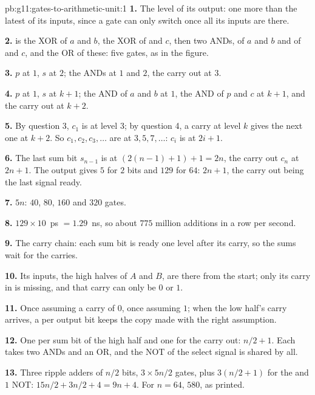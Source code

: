 \begin{solution}{pb:g11:gates-to-arithmetic-unit:1}
\textbf{1.} The level of its output: one more than the latest of its inputs, since a gate can only switch once all
its inputs are there.

\textbf{2.}  is the XOR of $a$ and $b$,  the XOR of  and $c$, then two ANDs, of $a$ and $b$
and of  and $c$, and the OR of these: five gates, as in the figure.

\textbf{3.} $p$ at $1$, $s$ at $2$; the ANDs at $1$ and $2$, the carry out at $3$.

\textbf{4.} $p$ at $1$, $s$ at $k + 1$; the AND of $a$ and $b$ at $1$, the AND of $p$ and $c$ at $k + 1$, and the
carry out at $k + 2$.

\textbf{5.} By question 3, $c_1$ is at level $3$; by question 4, a carry at level $k$ gives the next one at $k + 2$.
So $c_1, c_2, c_3, \dots$ are at $3, 5, 7, \dots$: $c_i$ is at $2i + 1$.

\textbf{6.} The last sum bit $s_{n-1}$ is at $(2(n - 1) + 1) + 1 = 2n$, the carry out $c_n$ at $2n + 1$. The output
gives $5$ for $2$ bits and $129$ for $64$: $2n + 1$, the carry out being the last signal ready.

\textbf{7.} $5n$: $40$, $80$, $160$ and $320$ gates.

\textbf{8.} $129 \times 10$~ps $= 1.29$~ns, so about $775$ million additions in a row per second.

\textbf{9.} The carry chain: each sum bit is ready one level after its carry, so the sums wait for the carries.

\textbf{10.} Its inputs, the high halves of $A$ and $B$, are there from the start; only its carry in is missing, and
that carry can only be $0$ or $1$.

\textbf{11.} Once assuming a carry of $0$, once assuming $1$; when the low half's carry arrives, a  per
output bit keeps the copy made with the right assumption.

\textbf{12.} One  per sum bit of the high half and one for the carry out: $n/2 + 1$. Each takes two ANDs
and an OR, and the NOT of the select signal is shared by all.

\textbf{13.} Three ripple adders of $n/2$ bits, $3 \times 5n/2$ gates, plus $3(n/2 + 1)$ for the  and $1$
NOT: $15n/2 + 3n/2 + 4 = 9n + 4$. For $n = 64$, $580$, as printed.


\end{solution}
